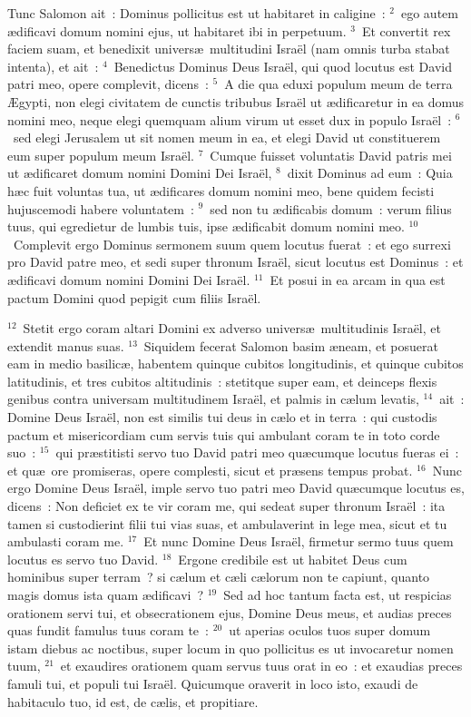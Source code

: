 \bchapter
\lettrine[lines=3,image=true,loversize=0.05,lraise=-0.03]{T}{}unc Salomon ait~: Dominus pollicitus est ut habitaret in caligine~:
${}^{2}$~ego autem \ae dificavi domum nomini ejus, ut habitaret ibi in perpetuum.
${}^{3}$~Et convertit rex faciem suam, et benedixit univers\ae\ multitudini Isra\"el (nam omnis turba stabat intenta), et ait~:
${}^{4}$~Benedictus Dominus Deus Isra\"el, qui quod locutus est David patri meo, opere complevit, dicens~:
${}^{5}$~A die qua eduxi populum meum de terra \AE gypti, non elegi civitatem de cunctis tribubus Isra\"el ut \ae dificaretur in ea domus nomini meo, neque elegi quemquam alium virum ut esset dux in populo Isra\"el~:
${}^{6}$~sed elegi Jerusalem ut sit nomen meum in ea, et elegi David ut constituerem eum super populum meum Isra\"el.
${}^{7}$~Cumque fuisset voluntatis David patris mei ut \ae dificaret domum nomini Domini Dei Isra\"el,
${}^{8}$~dixit Dominus ad eum~: Quia h\ae c fuit voluntas tua, ut \ae dificares domum nomini meo, bene quidem fecisti hujuscemodi habere voluntatem~:
${}^{9}$~sed non tu \ae dificabis domum~: verum filius tuus, qui egredietur de lumbis tuis, ipse \ae dificabit domum nomini meo.
${}^{10}$~Complevit ergo Dominus sermonem suum quem locutus fuerat~: et ego surrexi pro David patre meo, et sedi super thronum Isra\"el, sicut locutus est Dominus~: et \ae dificavi domum nomini Domini Dei Isra\"el.
${}^{11}$~Et posui in ea arcam in qua est pactum Domini quod pepigit cum filiis Isra\"el.


${}^{12}$~Stetit ergo coram altari Domini ex adverso univers\ae\ multitudinis Isra\"el, et extendit manus suas.
${}^{13}$~Siquidem fecerat Salomon basim \ae neam, et posuerat eam in medio basilic\ae , habentem quinque cubitos longitudinis, et quinque cubitos latitudinis, et tres cubitos altitudinis~: stetitque super eam, et deinceps flexis genibus contra universam multitudinem Isra\"el, et palmis in c\ae lum levatis,
${}^{14}$~ait~: Domine Deus Isra\"el, non est similis tui deus in c\ae lo et in terra~: qui custodis pactum et misericordiam cum servis tuis qui ambulant coram te in toto corde suo~:
${}^{15}$~qui pr\ae stitisti servo tuo David patri meo qu\ae cumque locutus fueras ei~: et qu\ae\ ore promiseras, opere complesti, sicut et pr\ae sens tempus probat.
${}^{16}$~Nunc ergo Domine Deus Isra\"el, imple servo tuo patri meo David qu\ae cumque locutus es, dicens~: Non deficiet ex te vir coram me, qui sedeat super thronum Isra\"el~: ita tamen si custodierint filii tui vias suas, et ambulaverint in lege mea, sicut et tu ambulasti coram me.
${}^{17}$~Et nunc Domine Deus Isra\"el, firmetur sermo tuus quem locutus es servo tuo David.
${}^{18}$~Ergone credibile est ut habitet Deus cum hominibus super terram~? si c\ae lum et c\ae li c\ae lorum non te capiunt, quanto magis domus ista quam \ae dificavi~?
${}^{19}$~Sed ad hoc tantum facta est, ut respicias orationem servi tui, et obsecrationem ejus, Domine Deus meus, et audias preces quas fundit famulus tuus coram te~:
${}^{20}$~ut aperias oculos tuos super domum istam diebus ac noctibus, super locum in quo pollicitus es ut invocaretur nomen tuum,
${}^{21}$~et exaudires orationem quam servus tuus orat in eo~: et exaudias preces famuli tui, et populi tui Isra\"el. Quicumque oraverit in loco isto, exaudi de habitaculo tuo, id est, de c\ae lis, et propitiare.


